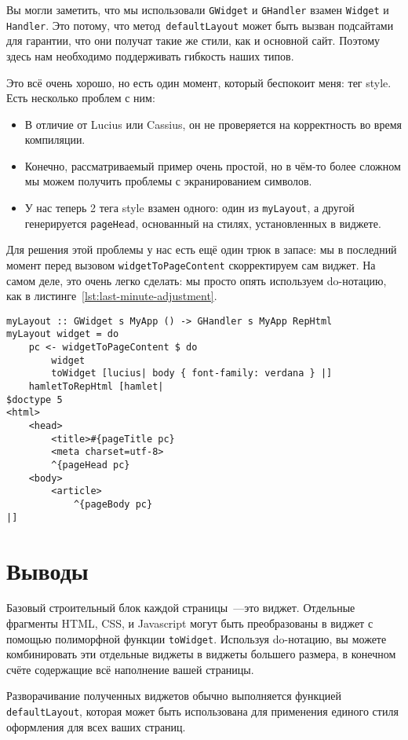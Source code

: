 \begin{remark}
    Вы могли заметить, что мы использовали \lstinline'GWidget' и
    \lstinline'GHandler' взамен \lstinline'Widget' и \lstinline'Handler'. Это
    потому, что метод~\lstinline'defaultLayout' может быть вызван подсайтами
    для гарантии, что они получат такие же стили, как и основной сайт. Поэтому
    здесь нам необходимо поддерживать гибкость наших типов.
\end{remark}

Это всё очень хорошо, но есть один момент, который беспокоит меня: тег style.
Есть несколько проблем с ним:
\begin{itemize}
    \item В отличие от Lucius или Cassius, он не проверяется на корректность во
        время компиляции.

    \item Конечно, рассматриваемый пример очень простой, но в чём-то более
        сложном мы можем получить проблемы с экранированием символов.

    \item У нас теперь 2 тега style взамен одного: один из
        \lstinline'myLayout', а другой генерируется \lstinline'pageHead',
        основанный на стилях, установленных в виджете.
\end{itemize}

Для решения этой проблемы у нас есть ещё один трюк в запасе: мы в последний
момент перед вызовом \lstinline'widgetToPageContent' скорректируем сам виджет.
На самом деле, это очень легко сделать: мы просто опять используем do-нотацию,
как в листинге~\ref{lst:last-minute-adjustment}.
\begin{lstlisting}[caption={Корректировка виджета <<в последний момент>>},label={lst:last-minute-adjustment}]
myLayout :: GWidget s MyApp () -> GHandler s MyApp RepHtml
myLayout widget = do
    pc <- widgetToPageContent $ do
        widget
        toWidget [lucius| body { font-family: verdana } |]
    hamletToRepHtml [hamlet|
$doctype 5
<html>
    <head>
        <title>#{pageTitle pc}
        <meta charset=utf-8>
        ^{pageHead pc}
    <body>
        <article>
            ^{pageBody pc}
|]
\end{lstlisting}

\section{Выводы}
Базовый строительный блок каждой страницы~---это виджет. Отдельные фрагменты
HTML, CSS, и Javascript могут быть преобразованы в виджет с помощью полиморфной
функции \lstinline'toWidget'. Используя do-нотацию, вы можете комбинировать эти
отдельные виджеты в виджеты большего размера, в конечном счёте содержащие всё
наполнение вашей страницы.

Разворачивание полученных виджетов обычно выполняется функцией
\lstinline'defaultLayout', которая может быть использована для применения
единого стиля оформления для всех ваших страниц.
